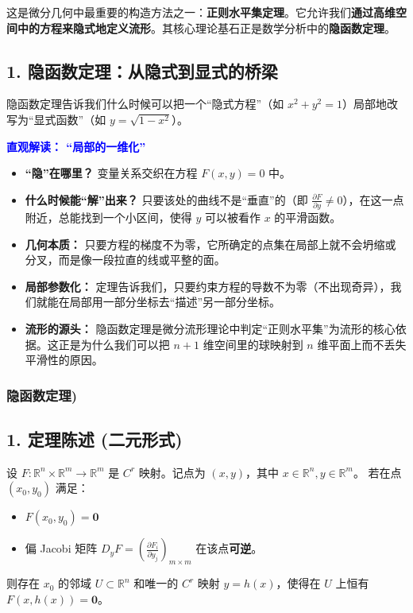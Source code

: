\begin{myremark}

这是微分几何中最重要的构造方法之一：\textbf{正则水平集定理}。它允许我们{\bf 通过高维空间中的方程来隐式地定义流形}。其核心理论基石正是数学分析中的\textbf{隐函数定理}。

\subsection*{1. 隐函数定理：从隐式到显式的桥梁}

隐函数定理告诉我们什么时候可以把一个“隐式方程”（如 $x^2 + y^2 = 1$）局部地改写为“显式函数”（如 $y = \sqrt{1-x^2}$）。

\textbf{\textcolor{blue}{直观解读： “局部的一维化”}}
\begin{itemize}
    \item \textbf{“隐”在哪里？} 变量关系交织在方程 $F(x, y) = 0$ 中。
    \item \textbf{什么时候能“解”出来？} 只要该处的曲线不是“垂直”的（即 $\frac{\partial F}{\partial y} \neq 0$），在这一点附近，总能找到一个小区间，使得 $y$ 可以被看作 $x$ 的平滑函数。
    \item \textbf{几何本质：} 只要方程的梯度不为零，它所确定的点集在局部上就不会坍缩或分叉，而是像一段拉直的线或平整的面。
\end{itemize}

\begin{itemize}
    \item \textbf{局部参数化：} 定理告诉我们，只要约束方程的导数不为零（不出现奇异），我们就能在局部用一部分坐标去“描述”另一部分坐标。
    \item \textbf{流形的源头：} 隐函数定理是微分流形理论中判定“正则水平集”为流形的核心依据。这正是为什么我们可以把 $n+1$ 维空间里的球映射到 $n$ 维平面上而不丢失平滑性的原因。
\end{itemize}

\subsubsection*{隐函数定理)}
\subsection*{1. 定理陈述 (二元形式)}
设 $F: \mathbb{R}^n \times \mathbb{R}^m \to \mathbb{R}^m$ 是 $C^r$ 映射。记点为 $(x, y)$，其中 $x \in \mathbb{R}^n, y \in \mathbb{R}^m$。
若在点 $(x_0, y_0)$ 满足：
\begin{itemize}
    \item $F(x_0, y_0) = \mathbf{0}$
    \item 偏 Jacobi 矩阵 $D_y F = \left( \frac{\partial F_i}{\partial y_j} \right)_{m \times m}$ 在该点\textbf{可逆}。
\end{itemize}
则存在 $x_0$ 的邻域 $U \subset \mathbb{R}^n$ 和唯一的 $C^r$ 映射 $y = h(x)$，使得在 $U$ 上恒有 $F(x, h(x)) = \mathbf{0}$。


\end{myremark}
